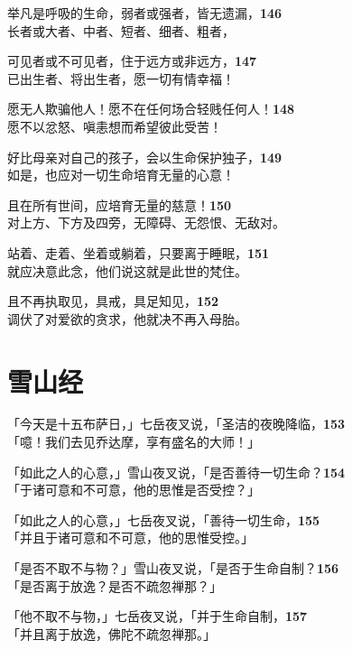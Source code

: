 举凡是呼吸的生命，弱者或强者，皆无遗漏，\hfill{\grayfootnotesize \textbf{146}} \\
长者或大者、中者、短者、细者、粗者，


可见者或不可见者，住于远方或非远方，\hfill{\grayfootnotesize \textbf{147}} \\
已出生者、将出生者，愿一切有情幸福！


愿无人欺骗他人！愿不在任何场合轻贱任何人！\hfill{\grayfootnotesize \textbf{148}} \\
愿不以忿怒、嗔恚想而希望彼此受苦！


好比母亲对自己的孩子，会以生命保护独子，\hfill{\grayfootnotesize \textbf{149}} \\
如是，也应对一切生命培育无量的心意！


且在所有世间，应培育无量的慈意！\hfill{\grayfootnotesize \textbf{150}} \\
对上方、下方及四旁，无障碍、无怨恨、无敌对。


站着、走着、坐着或躺着，只要离于睡眠，\hfill{\grayfootnotesize \textbf{151}} \\
就应决意此念，他们说这就是此世的梵住。


且不再执取见，具戒，具足知见，\hfill{\grayfootnotesize \textbf{152}} \\
调伏了对爱欲的贪求，他就决不再入母胎。


\section{雪山经}

「今天是十五布萨日，」七岳夜叉说，「圣洁的夜晚降临，\hfill{\grayfootnotesize \textbf{153}} \\
「噫！我们去见乔达摩，享有盛名的大师！」


「如此之人的心意，」雪山夜叉说，「是否善待一切生命？\hfill{\grayfootnotesize \textbf{154}} \\
「于诸可意和不可意，他的思惟是否受控？」


「如此之人的心意，」七岳夜叉说，「善待一切生命，\hfill{\grayfootnotesize \textbf{155}} \\
「并且于诸可意和不可意，他的思惟受控。」


「是否不取不与物？」雪山夜叉说，「是否于生命自制？\hfill{\grayfootnotesize \textbf{156}} \\
「是否离于放逸？是否不疏忽禅那？」


「他不取不与物，」七岳夜叉说，「并于生命自制，\hfill{\grayfootnotesize \textbf{157}} \\
「并且离于放逸，佛陀不疏忽禅那。」


